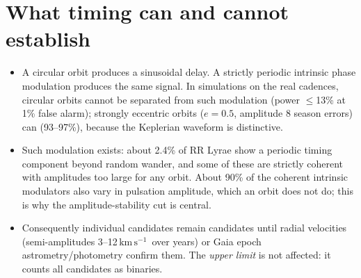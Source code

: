 \documentclass[11pt]{article}
\newcommand{\Msun}{\ensuremath{M_\odot}}
\newcommand{\kms}{\ensuremath{\mathrm{km\,s^{-1}}}}
\begin{document}
\begin{table}[ht]\centering\small
\caption{Follow-up short list. $P$, $e$: Keplerian fit to 1992--2026. $M_{2,\min}$: minimum companion mass ($M_1=0.65\,\Msun$,
edge-on). $K_1$: predicted radial-velocity semi-amplitude of the RR Lyrae.}
\label{tab:short}
\SHORTTABLE
\end{table}

\section{What timing can and cannot establish}\label{sec:limits_of_method}
\begin{itemize}[leftmargin=*]
\item A circular orbit produces a sinusoidal delay. A strictly periodic intrinsic phase modulation produces the same signal.
In simulations on the real cadences, circular orbits cannot be separated from such modulation (power $\le$13\% at 1\% false
alarm); strongly eccentric orbits ($e=0.5$, amplitude 8 season errors) can (93--97\%), because the Keplerian waveform is distinctive.
\item Such modulation exists: about 2.4\% of RR Lyrae show a periodic timing component beyond random wander, and some of these
are strictly coherent with amplitudes too large for any orbit. About 90\% of the coherent intrinsic modulators also vary in
pulsation amplitude, which an orbit does not do; this is why the amplitude-stability cut is central.
\item Consequently individual candidates remain candidates until radial velocities (semi-amplitudes 3--12\,\kms\ over years) or
Gaia epoch astrometry/photometry confirm them. The \emph{upper limit} is not affected: it counts all candidates as binaries.
\end{itemize}

\end{document}
